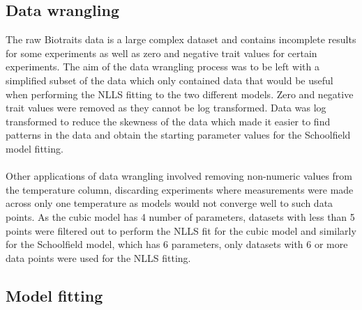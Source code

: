 {\subsection*{Data wrangling}

The raw Biotraits data is a large complex dataset and contains incomplete results for some experiments as well as zero and negative trait values for certain experiments. The aim of the data wrangling process was to be left with a simplified subset of the data which only contained data that would be useful when performing the NLLS fitting to the two different models. Zero and negative trait values were removed as they cannot be log transformed. Data was log transformed to reduce the skewness of the data which made it easier to find patterns in the data and obtain the starting parameter values for the Schoolfield model fitting.  
\\~\\
Other applications of data wrangling involved removing non-numeric values from the temperature column, discarding experiments where measurements were made across only one temperature as models would not converge well to such data points. As the cubic model has 4 number of parameters, datasets with less than 5 points were filtered out to perform the NLLS fit for the cubic model and similarly for the Schoolfield model, which has 6 parameters, only datasets with 6 or more data points were used for the NLLS fitting.  

\subsection*{Model fitting}

}
